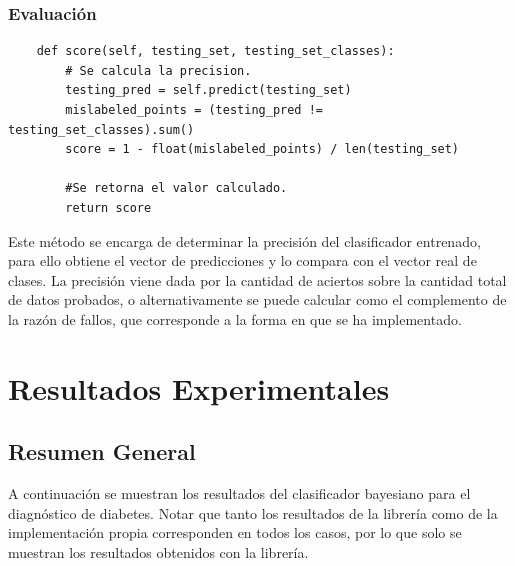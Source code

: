 \documentclass[letter, titlepage, 10pt]{article}
\begin{document}
\newpage

\subsubsection{Evaluación}
\begin{lstlisting}
    def score(self, testing_set, testing_set_classes):
        # Se calcula la precision.
        testing_pred = self.predict(testing_set)
        mislabeled_points = (testing_pred != testing_set_classes).sum()
        score = 1 - float(mislabeled_points) / len(testing_set)

        #Se retorna el valor calculado.
        return score

\end{lstlisting}

Este método se encarga de determinar la precisión del clasificador entrenado, para ello obtiene el vector de predicciones y lo compara con el vector real de clases. La precisión viene dada por la cantidad de aciertos sobre la cantidad total de datos probados, o alternativamente se puede calcular como el complemento de la razón de fallos, que corresponde a la forma en que se ha implementado.\\


\section{Resultados Experimentales}
\subsection{Resumen General}
A continuación se muestran los resultados del clasificador bayesiano para el diagnóstico de diabetes. Notar que tanto los resultados de la librería como de la implementación propia corresponden en todos los casos, por lo que solo se muestran los resultados obtenidos con la librería.
\end{document}
